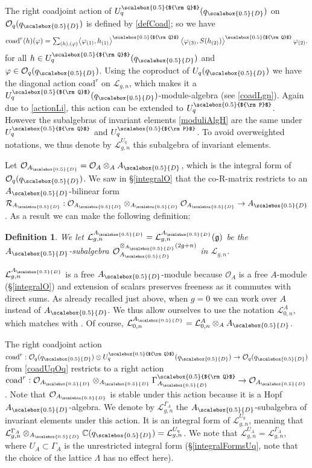 \documentclass[11pt]{amsart}
\newtheorem{defi}[teo]{Definition}
\newcommand{\Oo}{\mathcal{O}}
\newcommand{\qD}{q_{\scalebox{0.5}{D}}}
\newcommand{\AD}{A_{\scalebox{0.5}{D}}}
\newcommand{\Q}{{\scalebox{0.5}{${\rm Q}$}}}
\newcommand{\Pup}{{\scalebox{0.5}{${\rm P}$}}}
\begin{document}
\indent The right coadjoint action of $U_q^\Q(\qD)$ on $\Oo_q(\qD)$ is defined by \eqref{defCoad}; so we have
\begin{equation}\label{coadUqOq}
\textstyle \mathrm{coad}^r(h)(\varphi) = \sum_{(h),(\varphi)} \bigl\langle \varphi_{(1)}, h_{(1)} \bigr\rangle^\Q \, \bigl\langle \varphi_{(3)}, S(h_{(2)}) \bigr\rangle^\Q \, \varphi_{(2)}.
\end{equation}
for all $h \in U_q^\Q(\qD)$ and $\varphi \in \Oo_q(\qD)$. Using the coproduct of $U_q(\qD)$ we have the diagonal action $\mathrm{coad}^r$ on $\mathcal{L}_{g,n}$, which makes it a $U_q^\Q(\qD)$-module-algebra (see \eqref{coadLgn}). Again due to \eqref{actionLi}, this action can be extended to $U^\Pup_q$. However the subalgebras of invariant elements \eqref{moduliAlgH} are the same under $U_q^\Q$ and $U_q^\Pup$. To avoid overweighted notations, we thus denote by $\mathcal{L}_{g,n}^{U_q}$ this subalgebra of invariant elements.

\smallskip

\indent Let $\mathcal{O}_{\AD} = \mathcal{O}_A \otimes_A \AD$, which is the integral form of $\mathcal{O}_q(\qD)$. We saw in \S\ref{integralO} that the co-R-matrix restricts to an $\AD$-bilinear form $\mathcal{R}_{\AD} : \mathcal{O}_{\AD} \otimes_{\AD} \mathcal{O}_{\AD} \to \AD$. As a result we can make the following definition:
\begin{defi}\label{defIntVersionLgn}
We let $\mathcal{L}_{g,n}^{\AD} = \mathcal{L}_{g,n}^{\AD}(\mathfrak{g})$ be the $\AD$-subalgebra $\mathcal{O}_{\AD}^{\otimes_{\AD} (2g+n)}$ in $\mathcal{L}_{g,n}$.
\end{defi}
\noindent $\mathcal{L}_{g,n}^{\AD}$ is a free $\AD$-module because $\Oo_A$ is a free $A$-module (\S\ref{integralO}) and extension of scalars preserves freeness as it commutes with direct sums. As already recalled just above, when $g=0$ we can work over $A$ instead of $\AD$. We thus allow ourselves to use the notation $\mathcal{L}_{0,n}^A$, which matches with \cite{BR1,BR2}. Of course, $\mathcal{L}_{0,n}^{\AD} = \mathcal{L}_{0,n}^A \otimes_A \AD$.

\indent The right coadjoint action $\mathrm{coad}^r : \Oo_q(\qD) \otimes U_q^\Q(\qD) \to \Oo_q(\qD)$ from \eqref{coadUqOq} restricts to a right action $\mathrm{coad}^r : \Oo_{\AD} \otimes_{\AD} \Gamma_{\AD}^\Q \to \Oo_{\AD}$. Note that $\Oo_{\AD}$ is stable under this action because it is a Hopf $\AD$-algebra. We denote by $\mathcal{L}_{g,n}^{\Gamma_A}$ the $\AD$-subalgebra of invariant elements under this action. It is an integral form of $\mathcal{L}_{g,n}^{U_q}$, meaning that $\mathcal{L}_{g,n}^{\Gamma_A} \otimes_{\AD} \mathbb{C}(\qD) = \mathcal{L}_{g,n}^{U_q}$. We note that $\mathcal{L}_{g,n}^{U_A} = \mathcal{L}_{g,n}^{\Gamma_A}$, where $U_A \subset \Gamma_A$ is the unrestricted integral form (\S\ref{integralFormsUq}, note that the choice of the lattice $\Lambda$ has no effect here).
\end{document}
